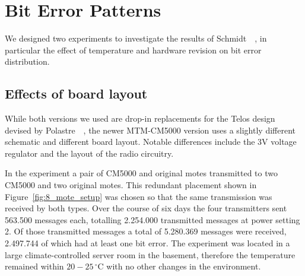\section{Bit Error Patterns}

We designed two experiments to investigate the results of Schmidt~\etal~\cite{Schmidt2013}, in particular the effect of temperature and hardware revision on bit error distribution.

\subsection{Effects of board layout}
\label{subsec:effects_of_board_layout}

While both versions we used are drop-in replacements for the Telos design devised by Polastre~\etal~\cite{Polastre2005}, the newer MTM-CM5000 version uses a slightly different schematic and different board layout.
Notable differences include the 3V voltage regulator and the layout of the radio circuitry.

In the experiment a pair of CM5000 and original motes transmitted to two CM5000 and two original motes.
This redundant placement shown in Figure~\ref{fig:8_mote_setup} was chosen so that the same transmission was received by both types.
Over the course of six days the four transmitters sent 563.500 messages each, totalling 2.254.000 transmitted messages at power setting 2. Of those transmitted messages a total of 5.280.369 messages were received, 2.497.744 of which had at least one bit error.
The experiment was located in a large climate-controlled server room in the basement, therefore the temperature remained within $20-25\,^{\circ}\mathrm{C}$ with no other changes in the environment.

